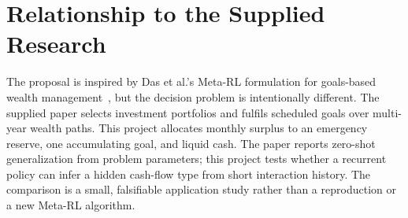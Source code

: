 \section{Relationship to the Supplied Research}\label{sec:relationship}

The proposal is inspired by Das et al.'s Meta-RL formulation for goals-based wealth management~\cite{dasmeta}, but the decision problem is intentionally different. The supplied paper selects investment portfolios and fulfils scheduled goals over multi-year wealth paths. This project allocates monthly surplus to an emergency reserve, one accumulating goal, and liquid cash. The paper reports zero-shot generalization from problem parameters; this project tests whether a recurrent policy can infer a hidden cash-flow type from short interaction history. The comparison is a small, falsifiable application study rather than a reproduction or a new Meta-RL algorithm.
